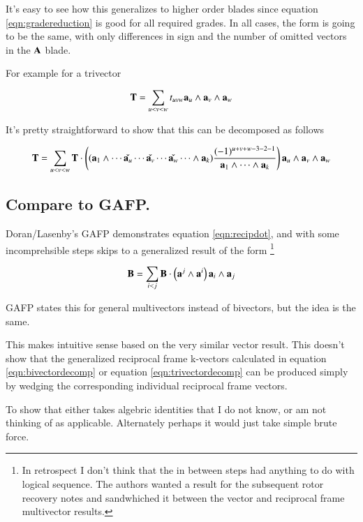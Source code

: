 \documentclass{article}      %
\begin{document}
It's easy to see how this generalizes to higher order blades since 
equation \ref{eqn:gradereduction} is good for all required grades.  In all cases, the form is going to be the same, with only differences
in sign and the number of omitted vectors in the $\mathbf{A}$ blade.

For example for a trivector

\[
\mathbf{T} = \sum_{u<v<w}t_{uvw} \mathbf{a}_u \wedge \mathbf{a}_v \wedge \mathbf{a}_w
\]

It's pretty straightforward to show that this can be decomposed as follows

\begin{equation}\label{eqn:trivectordecomp}
\mathbf{T} = \sum_{u<v<w} \mathbf{T} \cdot
\left(
(\mathbf{a}_1 \wedge \cdots \check{\mathbf{a}_u} \cdots \check{\mathbf{a}_v} \cdots \check{\mathbf{a}_w} \cdots \wedge \mathbf{a}_k)
\frac{(-1)^{u+v+w-3-2-1}}
{\mathbf{a}_1 \wedge \cdots \wedge \mathbf{a}_k}
\right)
\mathbf{a}_u \wedge \mathbf{a}_v \wedge \mathbf{a}_w
\end{equation}

\subsection{ Compare to GAFP. }

Doran/Lasenby's GAFP 
demonstrates equation \ref{eqn:recipdot}, and with some incomprehsible steps skips to a generalized
result of the form
\footnote{ In retrospect I don't think that the in between steps had anything to do with logical sequence.  The authors wanted a result for the subsequent rotor recovery notes and sandwhiched it between the vector and reciprocal frame multivector results.}

\begin{equation}\label{eqn:bivectordecompwithrecipbivector}
\mathbf{B} = \sum_{i<j} \mathbf{B} \cdot \left(\mathbf{a}^j \wedge \mathbf{a}^i\right) \mathbf{a}_i \wedge \mathbf{a}_j
\end{equation}

GAFP states this for general multivectors instead of bivectors, but the idea is the same.

This makes intuitive sense based on the very similar vector result.  This doesn't show that
the generalized reciprocal frame k-vectors calculated in 
equation \ref{eqn:bivectordecomp} or equation \ref{eqn:trivectordecomp} can be produced simply
by wedging the corresponding individual reciprocal frame vectors.

To show that either takes algebric identities that I do not know, or am not thinking of as applicable.
Alternately perhaps it would just take simple brute force.
\end{document}
